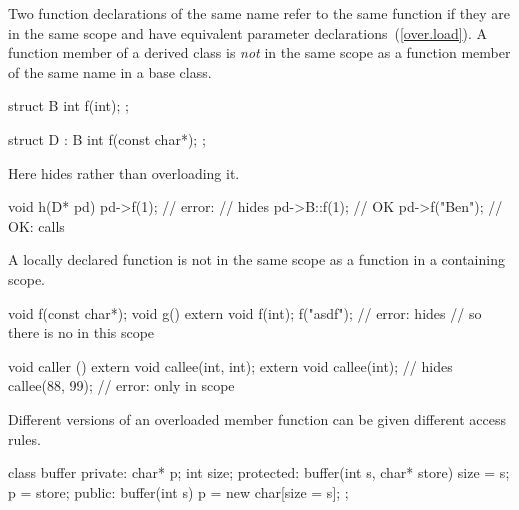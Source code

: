 \pnum
Two function declarations of the same name refer to the same function if they
are in the same scope and have equivalent parameter declarations~(\ref{over.load}).
A function member of a derived class is
\textit{not}
in the same scope as a function member of the same name in a base class.
\begin{example}

\begin{codeblock}
struct B {
  int f(int);
};

struct D : B {
  int f(const char*);
};
\end{codeblock}

%
%
Here
hides
rather than overloading it.

%
\begin{codeblock}
void h(D* pd) {
  pd->f(1);                     // error:
                                //  hides 
  pd->B::f(1);                  // OK
  pd->f("Ben");                 // OK: calls 
}
\end{codeblock}
\end{example}

\pnum
A locally declared function is not in the same scope as a function in
a containing scope.
\begin{example}

\begin{codeblock}
void f(const char*);
void g() {
  extern void f(int);
  f("asdf");                    // error:  hides 
                                // so there is no  in this scope
}

void caller () {
  extern void callee(int, int);
  {
    extern void callee(int);    // hides 
    callee(88, 99);             // error: only  in scope
  }
}
\end{codeblock}
\end{example}

\pnum
{}%
%
Different versions of an overloaded member function can be given different
access rules.
\begin{example}

\begin{codeblock}
class buffer {
private:
    char* p;
    int size;
protected:
    buffer(int s, char* store) { size = s; p = store; }
public:
    buffer(int s) { p = new char[size = s]; }
};
\end{codeblock}
\end{example}

